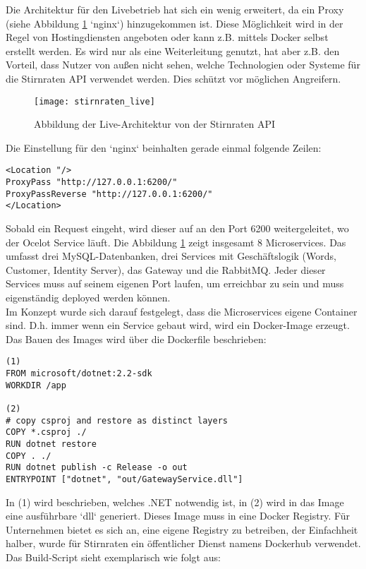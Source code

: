 Die Architektur für den Livebetrieb hat sich ein wenig erweitert, da ein Proxy (siehe Abbildung \ref{fig:stirnraten_live} `nginx`) hinzugekommen ist. Diese Möglichkeit wird in der Regel von Hostingdiensten angeboten oder kann z.B. mittels Docker selbst erstellt werden. Es wird nur als eine Weiterleitung genutzt, hat aber z.B. den Vorteil, dass Nutzer von außen nicht sehen, welche Technologien oder Systeme für die Stirnraten API verwendet werden. Dies schützt vor möglichen Angreifern.

\begin{figure}[ht]
	\centering
	\texttt{[image: stirnraten\_live]}
	\caption[Stirnraten Live Architektur] {Abbildung der Live-Architektur von der Stirnraten API}
	\label{fig:stirnraten_live}
\end{figure} 

Die Einstellung für den `nginx` beinhalten gerade einmal folgende Zeilen: 

\begin{verbatim}
<Location "/>
ProxyPass "http://127.0.0.1:6200/"
ProxyPassReverse "http://127.0.0.1:6200/"
</Location>
\end{verbatim}

Sobald ein Request eingeht, wird dieser auf an den Port 6200 weitergeleitet, wo der Ocelot Service läuft. Die Abbildung \ref{fig:stirnraten_live} zeigt insgesamt 8 Microservices. Das umfasst drei MySQL-Datenbanken, drei Services mit Geschäftslogik (Words, Customer, Identity Server), das Gateway und die RabbitMQ. Jeder dieser Services muss auf seinem eigenen Port laufen, um erreichbar zu sein und muss eigenständig deployed werden können.\\

Im Konzept wurde sich darauf festgelegt, dass die Microservices eigene Container sind. D.h. immer wenn ein Service gebaut wird, wird ein Docker-Image erzeugt. Das Bauen des Images wird über die Dockerfile beschrieben: 

\begin{verbatim}
(1)
FROM microsoft/dotnet:2.2-sdk
WORKDIR /app

(2)
# copy csproj and restore as distinct layers
COPY *.csproj ./
RUN dotnet restore
COPY . ./
RUN dotnet publish -c Release -o out
ENTRYPOINT ["dotnet", "out/GatewayService.dll"]
\end{verbatim}

In (1) wird beschrieben, welches .NET notwendig ist, in (2) wird in das Image eine ausführbare `dll` generiert. Dieses Image muss in eine Docker Registry. Für Unternehmen bietet es sich an, eine eigene Registry zu betreiben, der Einfachheit halber, wurde für Stirnraten ein öffentlicher Dienst namens Dockerhub verwendet. Das Build-Script sieht exemplarisch wie folgt aus: 

